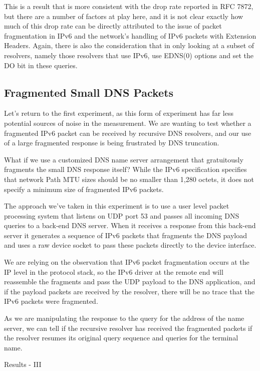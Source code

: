 This is a result that is more consistent with the drop rate reported in RFC 7872, but there are a number of factors at play here, and it is not clear exactly how much of this drop rate can be directly attributed to the issue of packet fragmentation in IPv6 and the network’s handling of IPv6 packets with Extension Headers. Again, there is also the consideration that in only looking at a subset of resolvers, namely those resolvers that use IPv6, use EDNS(0) options and set the DO bit in these queries.

\subsection{Fragmented Small DNS Packets}

Let’s return to the first experiment, as this form of experiment has far less potential sources of noise in the measurement. We are wanting to test whether a fragmented IPv6 packet can be received by recursive DNS resolvers, and our use of a large fragmented response is being frustrated by DNS truncation.

What if we use a customized DNS name server arrangement that gratuitously fragments the small DNS response itself? While the IPv6 specification specifies that network Path MTU sizes should be no smaller than 1,280 octets, it does not specify a minimum size of fragmented IPv6 packets.

The approach we’ve taken in this experiment is to use a user level packet processing system that listens on UDP port 53 and passes all incoming DNS queries to a back-end DNS server. When it receives a response from this back-end server it generates a sequence of IPv6 packets that fragments the DNS payload and uses a raw device socket to pass these packets directly to the device interface.

We are relying on the observation that IPv6 packet fragmentation occurs at the IP level in the protocol stack, so the IPv6 driver at the remote end will reassemble the fragments and pass the UDP payload to the DNS application, and if the payload packets are received by the resolver, there will be no trace that the IPv6 packets were fragmented.

As we are manipulating the response to the query for the address of the name server, we can tell if the recursive resolver has received the fragmented packets if the resolver resumes its original query sequence and queries for the terminal name.

Results - III 

